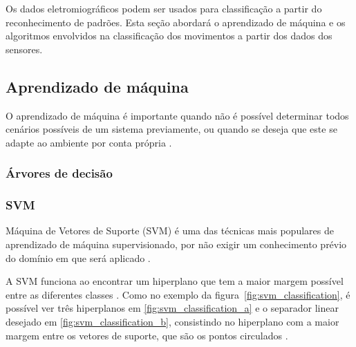 Os dados eletromiográficos podem ser usados para classificação a partir do reconhecimento de padrões. Esta seção abordará o aprendizado de máquina e os algoritmos envolvidos na classificação dos movimentos a partir dos dados dos sensores.

\subsection{Aprendizado de máquina}
O aprendizado de máquina é importante quando não é possível determinar todos cenários possíveis de um sistema previamente, ou quando se deseja que este se adapte ao ambiente por conta própria \cite{russell:2010}. %

\subsubsection{Árvores de decisão}

\subsubsection{SVM}
Máquina de Vetores de Suporte (SVM) é uma das técnicas mais populares de aprendizado de máquina supervisionado, por não exigir um conhecimento prévio do domínio em que será aplicado \cite{russell:2010}.

A SVM funciona ao encontrar um hiperplano que tem a maior margem possível entre as diferentes classes \cite{hearst:1998}. Como no exemplo da figura~\ref{fig:svm_classification}, é possível ver três hiperplanos em \ref{fig:svm_classification_a} e o separador linear desejado em \ref{fig:svm_classification_b}, consistindo no hiperplano com a maior margem entre os vetores de suporte, que são os pontos circulados \cite{russell:2010}.


